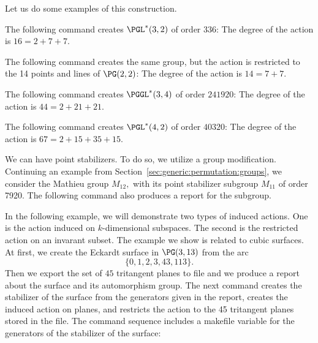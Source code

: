 Let us do some examples of this construction. 

\bigskip

The following command creates $\PGL^*(3,2)$ of order 336:
The degree of the action is $16 = 2 + 7 + 7.$ 

\bigskip

The following command creates the same group, 
but the action is restricted to 
the 14 points and lines of $\PG(2,2)$:
The degree of the action is $14 = 7 + 7.$ 





\bigskip

The following command creates $\PGGL^*(3,4)$ of order $241920$:
The degree of the action is $44 = 2 + 21 + 21.$ 



\bigskip

The following command creates $\PGL^*(4,2)$ of order $40320$:
The degree of the action is $67 = 2 + 15 + 35 + 15.$ 





\bigskip

We can have point stabilizers.
To do so, we utilize a group modification. 
Continuing an example from Section~\ref{sec:generic:permutation:groups}, 
we consider the Mathieu group $M_{12},$ with its 
point stabilizer subgroup $M_{11}$ of order 7920.  
The following command also produces a report for the subgroup.




\bigskip



In the following example, we will demonstrate two types of induced actions. 
One is the action induced on $k$-dimensional subspaces. 
The second is the restricted action on an invarant subset.
The example we show is related to cubic surfaces.
At first, we create the Eckardt surface in $\PG(3,13)$ from 
the arc 
$$
\{0,1,2,3,43,113\}. 
$$
Then we export the set of $45$ tritangent planes to file 
and we produce a report about the surface and its automorphism group.
The next command creates the stabilizer of the surface 
from the generators given in the report, 
creates the induced action on planes, 
and restricts the action to the 45 tritangent planes stored in the file.
The command sequence includes a makefile variable 
for the generators of the stabilizer of the surface:

